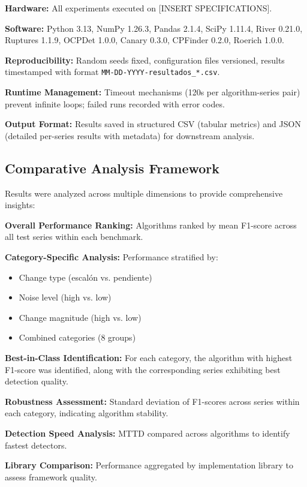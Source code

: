 \documentclass[journal,article,submit,pdftex,moreauthors]{Definitions/mdpi}
\begin{document}
\textbf{Hardware:} All experiments executed on [INSERT SPECIFICATIONS].

\textbf{Software:} Python 3.13, NumPy 1.26.3, Pandas 2.1.4, SciPy 1.11.4, River 0.21.0, Ruptures 1.1.9, OCPDet 1.0.0, Canary 0.3.0, CPFinder 0.2.0, Roerich 1.0.0.

\textbf{Reproducibility:} Random seeds fixed, configuration files versioned, results timestamped with format \texttt{MM-DD-YYYY-resultados\_*.csv}.

\textbf{Runtime Management:} Timeout mechanisms (120s per algorithm-series pair) prevent infinite loops; failed runs recorded with error codes.

\textbf{Output Format:} Results saved in structured CSV (tabular metrics) and JSON (detailed per-series results with metadata) for downstream analysis.

\subsection{Comparative Analysis Framework}

Results were analyzed across multiple dimensions to provide comprehensive insights:

\textbf{Overall Performance Ranking:} Algorithms ranked by mean F1-score across all test series within each benchmark.

\textbf{Category-Specific Analysis:} Performance stratified by:
\begin{itemize}
    \item Change type (escalón vs. pendiente)
    \item Noise level (high vs. low)
    \item Change magnitude (high vs. low)
    \item Combined categories (8 groups)
\end{itemize}

\textbf{Best-in-Class Identification:} For each category, the algorithm with highest F1-score was identified, along with the corresponding series exhibiting best detection quality.

\textbf{Robustness Assessment:} Standard deviation of F1-scores across series within each category, indicating algorithm stability.

\textbf{Detection Speed Analysis:} MTTD compared across algorithms to identify fastest detectors.

\textbf{Library Comparison:} Performance aggregated by implementation library to assess framework quality.
\end{document}
